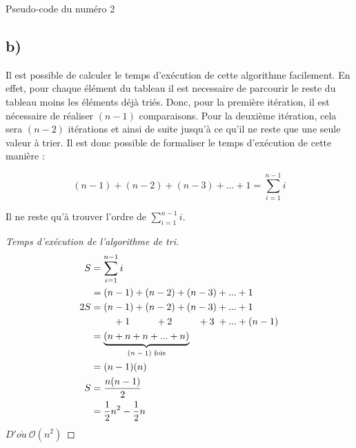 \documentclass[12pt]{article}
\begin{document}
    \begin{algorithm}[H]
      \caption{Pseudo-code du numéro 2}
    \end{algorithm}

  \subsection*{b)}

    Il est possible de calculer le temps d'exécution de cette algorithme
    facilement. En effet, pour chaque élément du tableau il est necessaire de
    parcourir le reste du tableau moins les éléments déjà triés. Donc, pour la
    première itération, il est nécessaire de réaliser \( (n - 1) \) comparaisons.
    Pour la deuxième itération, cela sera \( (n - 2) \) itérations et ainsi de
    suite jusqu'à ce qu'il ne reste que une seule valeur à trier. Il est donc
    possible de formaliser le temps d'exécution de cette manière :

    \[ (n - 1) + (n - 2) + (n - 3) + ... + 1 = \sum _ {i=1} ^ {n - 1} i \]

    Il ne reste qu'à trouver l'ordre de \( \sum _ {i=1} ^ {n - 1} i \). \newpage

    \begin{proof}[Temps d'exécution de l'algorithme de tri]
      \begin{align*}
        S   &= \sum _ {i=1} ^ {n - 1} i \\
            &= (n - 1) + (n - 2) + (n - 3) + ... + 1 \\
        2S  &= (n - 1) + (n - 2) + (n - 3) + ... + 1 \\
            &\qquad\,\, + 1 \qquad\;\:\, + 2 \qquad\;\:\, + 3 \;+ ... + (n - 1) \\
            &= \underbrace{(n + n + n + ... + n)}_\textrm{\( (n - 1) \) fois} \\
            &= (n - 1)(n) \\
        S   &= \frac{n(n - 1)}{2} \\
            &= \frac{1}{2}n^2 - \frac{1}{2}n
      \end{align*}
      \( D'o\grave{u} \ \mathcal{O}(n^2) \)
    \end{proof}
\end{document}
